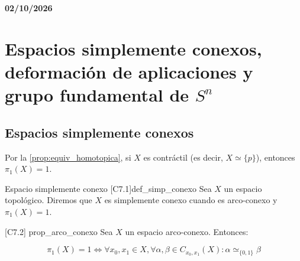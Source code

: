 \textbf{02/10/2026}
\section{Espacios simplemente conexos, deformación de aplicaciones y grupo fundamental de $S^n$}

\subsection{Espacios simplemente conexos}

\begin{observacion}{}{}
Por la \cref{prop:equiv_homotopica}, si $X$ es contráctil (es decir, $X \simeq \{p\}$), entonces $\pi_1(X) = 1$.
\end{observacion}

\begin{definicion}{Espacio simplemente conexo [C7.1]}{def_simp_conexo}
Sea $X$ un espacio topológico. Diremos que $X$ es simplemente conexo cuando es arco-conexo y $\pi_1(X) = 1$.
\end{definicion}

\begin{proposicion}{ [C7.2] \marcaP}{prop_arco_conexo}
Sea $X$ un espacio arco-conexo. Entonces:

$$\pi_1(X) = 1 \iff \forall x_0, x_1 \in X, \forall \alpha, \beta \in C_{x_0, x_1}(X) : \alpha \simeq_{\{0,1\}} \beta$$
\end{proposicion}

